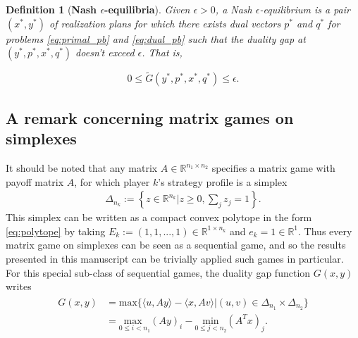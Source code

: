 \documentclass[a4paper,9pt]{extarticle}
\newtheorem{definition}{Definition}
\begin{document}
\begin{definition}[\textbf{Nash $\epsilon$-equilibria}]
Given $\epsilon > 0$, a Nash $\epsilon$-equilibrium is
a pair $(x^*, y^*)$ of realization plans for which there exists dual
vectors $p^*$ and $q^*$ for problems \eqref{eq:primal_pb} and
\eqref{eq:dual_pb} such that the duality gap at $(y^*, p^*, x^*, q^*)$
doesn't exceed $\epsilon$. That is,

\begin{equation}
  0 \le \tilde{G}(y^*, p^*, x^*, q^*) \le \epsilon.
\label{eq:approx_pb}
\end{equation}
\label{thm:approx_nash}
\end{definition}

\subsection{A remark concerning matrix games on simplexes}
It should be noted that any matrix $A \in \mathbb{R}^{n_1 \times n_2}$
specifies a matrix game with payoff matrix $A$, for which player $k$'s
strategy profile is a simplex
\begin{eqnarray}
\Delta_{n_k} := \left\{z \in \mathbb{R}^{n_k}|z \ge 0,\sum_j
z_j = 1\right\}.
\end{eqnarray}
This simplex can be written as a compact convex polytope in
the form \eqref{eq:polytope} by taking $E_k := (1, 1, ..., 1) \in
\mathbb{R}^{1 \times n_k}$ and $e_k = 1 \in \mathbb{R}^1$. Thus every
matrix game on simplexes can be seen as a sequential game, and so the
results presented in this manuscript can be trivially applied such
games in particular. For this special sub-class of sequential games,
the duality gap function $G(x,y)$ writes
\begin{eqnarray}
\begin{split}
G(x, y) &=
\mathrm{max}\{\langle u, Ay\rangle - \langle x, Av\rangle | (u,v) \in
\Delta_{n_1} \times \Delta_{n_2}\}\\
&= \underset{0 \le i <
  n_1}{\text{max }}(Ay)_i - \underset{0 \le j < n_2}{\text{min
}}(A^Tx)_j.
\end{split}
\label{eq:mg_pd}
\end{eqnarray}
\end{document}
